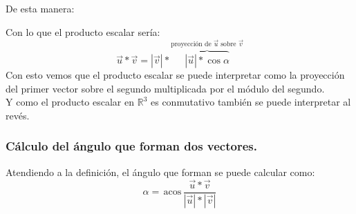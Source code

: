 \documentclass[a4paper,11pt,answers]{exam}
\newcommand{\acos}{\,\mathrm{acos}\,}
\begin{document}
De esta manera:
\begin{center}
\end{center}
Con lo que el producto escalar sería:
\[\vec u * \vec v = |\vec v| * \overbrace{|\vec u| * \cos \alpha}^\text{proyección de $\vec u$ sobre $\vec v$}\]
Con esto vemos que el producto escalar se puede interpretar como la proyección del primer vector sobre el segundo multiplicada por el módulo del segundo.\\
Y como el producto escalar en $\mathbb{R}^3$ es conmutativo también se puede interpretar al revés.
\subsubsection{Cálculo del ángulo que forman dos vectores.}
Atendiendo a la definición, el ángulo que forman se puede calcular como:
\[\alpha = \acos \frac{\vec u * \vec v}{|\vec u| *|\vec v|}\]
\end{document}
